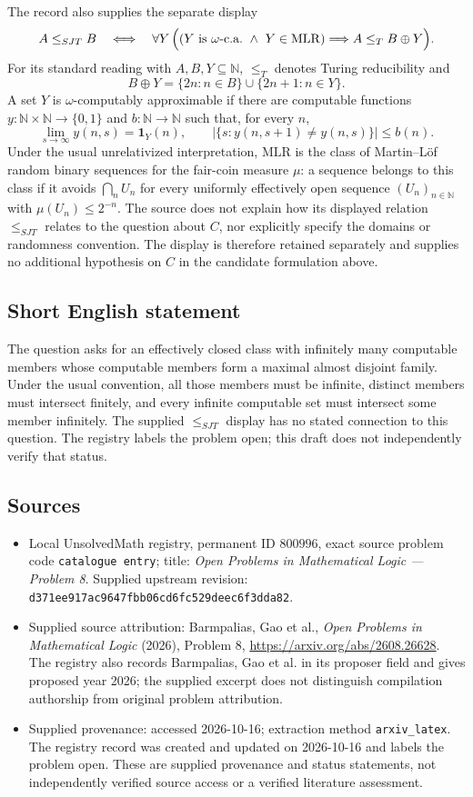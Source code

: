 \documentclass[11pt]{article}
\newcommand{\N}{\mathbb{N}}
\begin{document}
The record also supplies the separate display
\[
A\le_{SJT}B
\quad\Longleftrightarrow\quad
\forall Y\,
\Bigl((Y\text{ is }\omega\text{-c.a.}\ \land\ Y\in\mathrm{MLR})
\Longrightarrow A\le_T B\oplus Y\Bigr).
\]
For its standard reading with \(A,B,Y\subseteq\N\), \(\le_T\) denotes Turing reducibility and
\[
B\oplus Y=\{2n:n\in B\}\cup\{2n+1:n\in Y\}.
\]
A set \(Y\) is \(\omega\)-computably approximable if there are computable functions \(y:\N\times\N\to\{0,1\}\) and \(b:\N\to\N\) such that, for every \(n\),
\[
\lim_{s\to\infty}y(n,s)=\mathbf 1_Y(n),\qquad
\bigl|\{s:y(n,s+1)\ne y(n,s)\}\bigr|\le b(n).
\]
Under the usual unrelativized interpretation, \(\mathrm{MLR}\) is the class of Martin--L\"of random binary sequences for the fair-coin measure \(\mu\): a sequence belongs to this class if it avoids \(\bigcap_n U_n\) for every uniformly effectively open sequence \((U_n)_{n\in\N}\) with \(\mu(U_n)\le 2^{-n}\). The source does not explain how its displayed relation \(\le_{SJT}\) relates to the question about \(C\), nor explicitly specify the domains or randomness convention. The display is therefore retained separately and supplies no additional hypothesis on \(C\) in the candidate formulation above.
\subsection{Short English statement}
The question asks for an effectively closed class with infinitely many computable members whose computable members form a maximal almost disjoint family. Under the usual convention, all those members must be infinite, distinct members must intersect finitely, and every infinite computable set must intersect some member infinitely. The supplied \(\le_{SJT}\) display has no stated connection to this question. The registry labels the problem open; this draft does not independently verify that status.
\subsection{Sources}
\begin{itemize}
\item Local UnsolvedMath registry, permanent ID \(800996\), exact source problem code \texttt{catalogue entry}; title: \emph{Open Problems in Mathematical Logic --- Problem 8}. Supplied upstream revision: \texttt{d371ee917ac9647fbb06cd6fc529deec6f3dda82}.
\item Supplied source attribution: Barmpalias, Gao et al., \emph{Open Problems in Mathematical Logic} (2026), Problem 8, \url{https://arxiv.org/abs/2608.26628}. The registry also records Barmpalias, Gao et al. in its proposer field and gives proposed year 2026; the supplied excerpt does not distinguish compilation authorship from original problem attribution.
\item Supplied provenance: accessed 2026-10-16; extraction method \texttt{arxiv\_latex}. The registry record was created and updated on 2026-10-16 and labels the problem open. These are supplied provenance and status statements, not independently verified source access or a verified literature assessment.
\end{itemize}
\end{document}
